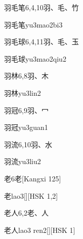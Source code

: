 \begin{entry}{羽毛笔}{6,4,10}{⽻、⽑、⽵}
  \begin{phonetics}{羽毛笔}{yu3mao2bi3}
  \end{phonetics}
\end{entry}

\begin{entry}{羽毛球}{6,4,11}{⽻、⽑、⽟}
  \begin{phonetics}{羽毛球}{yu3mao2qiu2}
  \end{phonetics}
\end{entry}

\begin{entry}{羽林}{6,8}{⽻、⽊}
  \begin{phonetics}{羽林}{yu3lin2}
  \end{phonetics}
\end{entry}

\begin{entry}{羽冠}{6,9}{⽻、⼍}
  \begin{phonetics}{羽冠}{yu3guan1}
  \end{phonetics}
\end{entry}

\begin{entry}{羽流}{6,10}{⽻、⽔}
  \begin{phonetics}{羽流}{yu3liu2}
  \end{phonetics}
\end{entry}

\begin{entry}{老}{6}{⽼}[Kangxi 125]
  \begin{phonetics}{老}{lao3}[][HSK 1,2]
  \end{phonetics}
\end{entry}

\begin{entry}{老人}{6,2}{⽼、⼈}
  \begin{phonetics}{老人}{lao3 ren2}[][HSK 1]
  \end{phonetics}
\end{entry}

